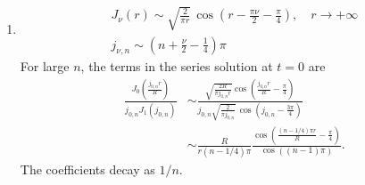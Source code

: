 {\begin{Solution}
\begin{enumerate}
    The eigensolutions of Equation~\ref{phi_t=a^2Deltaphi} are
    \[
    \phi_n(r,t) = \frac{ \sqrt{2} }{ R J_1( j_{0,n} ) }
    J_0 \left( \frac{ j_{0,n} r }{ R } \right)
    \exp \left( - \left( \frac{ a j_{0,n} }{ R^2 } \right)^2 t \right)
    \]
    The solution is a linear combination of the eigensolutions.
    \[
    \phi = \sum_{n=1}^\infty c_n \frac{ \sqrt{2} }{ R J_1( j_{0,n} ) }
    J_0 \left( \frac{ j_{0,n} r }{ R } \right)
    \exp \left( - \left( \frac{ a j_{0,n} }{ R^2 } \right)^2 t \right)
    \]
    We determine the coefficients from the initial condition.
    \begin{gather*}
      \phi(r,\theta,0) = V \\
      \sum_{n=1}^\infty c_n \frac{ \sqrt{2} }{ R J_1( j_{0,n} ) }
      J_0 \left( \frac{ j_{0,n} r }{ R } \right) = V \\
      c_n = \int_0^R V r \frac{ \sqrt{2} }{ R J_1( j_{0,n} ) }
      J_0 \left( \frac{ j_{0,n} r }{ R } \right) \,\dd r \\
      c_n = V \frac{ \sqrt{2} }{ R J_1( j_{0,n} ) } 
      \frac{ R }{ j_{0,n} / R } 
      J_1 \left( j_{0,n} \right) \\
      c_n = \frac{ \sqrt{2}\ V R }{ j_{0,n} } \\
      \boxed{
        \phi(r,\theta,t) = 2 V \sum_{n=1}^\infty 
        \frac{ J_0 \left( \frac{ j_{0,n} r }{ R } \right) }
        { j_{0,n} J_1( j_{0,n} ) }
        \exp \left( - \left( \frac{ a j_{0,n} }{ R^2 } \right)^2 t \right)
        }
    \end{gather*}
  \item
    \begin{gather*}
      J_\nu(r) \sim \sqrt{ \frac{ 2 }{ \pi r } }\, \cos \left(
        r - \frac{\pi \nu}{2} - \frac{\pi}{4} \right), \quad
      r \to +\infty \\
      j_{\nu,n} \sim \left( n + \frac{\nu}{2} - \frac{1}{4} \right) \pi
    \end{gather*}
    For large $n$, the terms in the series solution at $t = 0$ are
    \begin{align*}
      \frac{ J_0 \left( \frac{ j_{0,n} r }{ R } \right) }
      { j_{0,n} J_1( j_{0,n} ) }
      &\sim \frac{ \sqrt{ \frac{ 2 R }{ \pi j_{0,n} r } } \cos \left(
          \frac{ j_{0,n} r }{ R } - \frac{\pi}{4} \right) }
      { j_{0,n} \sqrt{ \frac{ 2 }{ \pi j_{0,n} } }\, \cos \left(
          j_{0,n} - \frac{3 \pi}{4} \right) } \\
      &\sim \frac{ R }{ r (n - 1/4) \pi }
      \frac{ \cos \left( \frac{ (n - 1/4) \pi r }{ R } 
          - \frac{\pi}{4} \right) }
      { \cos \left( (n - 1) \pi \right) }.
    \end{align*}
    The coefficients decay as $1/n$.
  \end{enumerate}
\end{Solution}






}
